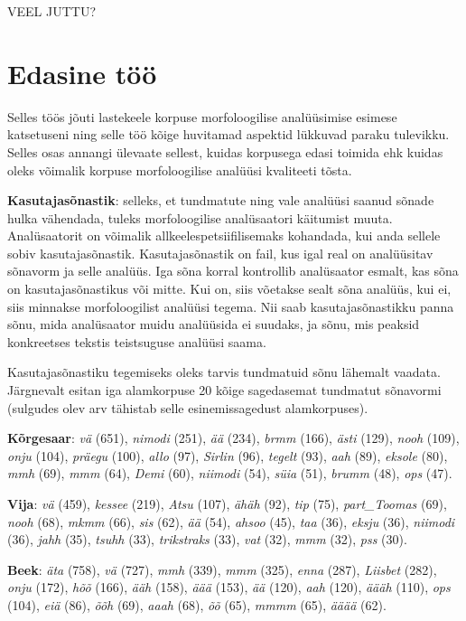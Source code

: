 \documentclass[12pt]{article}
\begin{document}
VEEL JUTTU?


\newpage
\section{Edasine töö}

Selles töös jõuti lastekeele korpuse morfoloogilise analüüsimise esimese katsetuseni ning selle töö kõige huvitamad aspektid lükkuvad paraku tulevikku. Selles osas annangi ülevaate sellest, kuidas korpusega edasi toimida ehk kuidas oleks võimalik korpuse morfoloogilise analüüsi kvaliteeti tõsta.

\textbf{Kasutajasõnastik}: selleks, et tundmatute ning vale analüüsi saanud sõnade hulka vähendada, tuleks morfoloogilise analüsaatori käitumist muuta. Analüsaatorit on võimalik allkeelespetsiifilisemaks kohandada, kui anda sellele sobiv kasutajasõnastik. Kasutajasõnastik on fail, kus igal real on analüüsitav sõnavorm ja selle analüüs. Iga sõna korral kontrollib analüsaator esmalt, kas sõna on kasutajasõnastikus või mitte. Kui on, siis võetakse sealt sõna analüüs, kui ei, siis minnakse morfoloogilist analüüsi tegema. Nii saab kasutajasõnastikku panna sõnu, mida analüsaator muidu analüüsida ei suudaks, ja sõnu, mis peaksid konkreetses tekstis teistsuguse analüüsi saama.

Kasutajasõnastiku tegemiseks oleks tarvis tundmatuid sõnu lähemalt vaadata. 
Järgnevalt esitan iga alamkorpuse 20 kõige sagedasemat tundmatut sõnavormi (sulgudes olev arv tähistab selle esinemissagedust alamkorpuses).

\textbf{Kõrgesaar}: \emph{vä} (651), \emph{nimodi} (251), \emph{ää} (234), \emph{brmm} (166), \emph{ästi} (129), \emph{nooh} (109), \emph{onju} (104), \emph{präegu} (100), \emph{allo} (97), \emph{Sirlin} (96), \emph{tegelt} (93), \emph{aah} (89), \emph{eksole} (80), \emph{mmh} (69), \emph{mmm} (64), \emph{Demi} (60), \emph{niimodi} (54), \emph{süia} (51), \emph{brumm} (48), \emph{ops} (47).

\textbf{Vija}: \emph{vä} (459), \emph{kessee} (219), \emph{Atsu} (107), \emph{ähäh} (92), \emph{tip} (75), \emph{part\_Toomas} (69), \emph{nooh} (68), \emph{mkmm} (66), \emph{sis} (62), \emph{ää} (54), \emph{ahsoo} (45), \emph{taa} (36), \emph{eksju} (36), \emph{niimodi} (36), \emph{jahh} (35), \emph{tsuhh} (33), \emph{trikstraks} (33), \emph{vat} (32), \emph{mmm} (32), \emph{pss} (30).

\textbf{Beek}: \emph{äta} (758), \emph{vä} (727), \emph{mmh} (339), \emph{mmm} (325), \emph{enna} (287), \emph{Liisbet} (282), \emph{onju} (172), \emph{hõõ} (166), \emph{ääh} (158), \emph{äää} (153), \emph{ää} (120), \emph{aah} (120), \emph{äääh} (110), \emph{ops} (104), \emph{eiä} (86), \emph{õõh} (69), \emph{aaah} (68), \emph{õõ} (65), \emph{mmmm} (65), \emph{ääää} (62).
\end{document}
